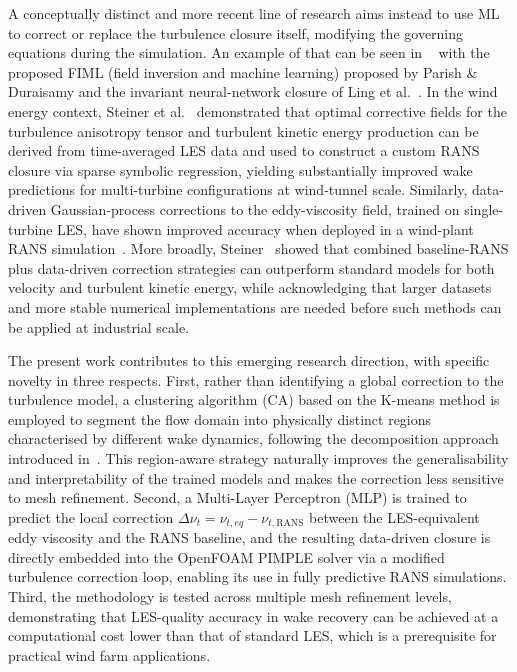 A conceptually distinct and more recent line of research aims instead to use ML to correct or replace the turbulence closure itself, modifying the governing equations during the simulation. An example of that can be seen in ~\cite{Duraisamy2019} with the proposed FIML (field inversion and machine learning) proposed by Parish \& Duraisamy and the invariant neural-network closure of Ling et al.~\cite{Ling2016}. In the wind energy context, Steiner et al.~\cite{Steiner2021} demonstrated that optimal corrective fields for the turbulence anisotropy tensor and turbulent kinetic energy production can be derived from time-averaged LES data and used to construct a custom RANS closure via sparse symbolic regression, yielding substantially improved wake predictions for multi-turbine configurations at wind-tunnel scale. Similarly, data-driven Gaussian-process corrections to the eddy-viscosity field, trained on single-turbine LES, have shown improved accuracy when deployed in a wind-plant RANS simulation~\cite{King_2018}. More broadly, Steiner~\cite{72116acdc5aa4b3b8fc752f1b2fa9958} showed that combined baseline-RANS plus data-driven correction strategies can outperform standard models for both velocity and turbulent kinetic energy, while acknowledging that larger datasets and more stable numerical implementations are needed before such methods can be applied at industrial scale.

The present work contributes to this emerging research direction, with specific novelty in three respects. First, rather than identifying a global correction to the turbulence model, a clustering algorithm (CA) based on the K-means method is employed to segment the flow domain into physically distinct regions characterised by different wake dynamics, following the decomposition approach introduced in~\cite{Clustering_tieghi,Carloni2026}. This region-aware strategy naturally improves the generalisability and interpretability of the trained models and makes the correction less sensitive to mesh refinement. Second, a Multi-Layer Perceptron (MLP) is trained to predict the local correction $\Delta\nu_t = \nu_{t,eq} - \nu_{t,\mathrm{RANS}}$ between the LES-equivalent eddy viscosity and the RANS baseline, and the resulting data-driven closure is directly embedded into the OpenFOAM PIMPLE solver via a modified turbulence correction loop, enabling its use in fully predictive RANS simulations. Third, the methodology is tested across multiple mesh refinement levels, demonstrating that LES-quality accuracy in wake recovery can be achieved at a computational cost lower than that of standard LES, which is a prerequisite for practical wind farm applications.

